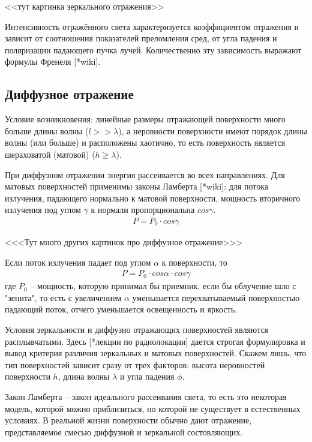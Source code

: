 <<тут картинка зеркального отражения>>

Интенсивность отражённого света характеризуется коэффициентом отражения и зависит от соотношения показателей преломления сред, от угла падения и поляризации падающего пучка лучей. Количественно эту зависимость выражают формулы Френеля [*wiki].

\subsection*{Диффузное отражение}

Условие возникновения: линейные размеры отражающей поверхности много больше длины волны ($ l >> \lambda $), а неровности поверхности имеют порядок длины волны (или больше) и расположены хаотично, то есть поверхность является шераховатой (матовой) ($ h \ge \lambda $). 

При диффузном отражении энергия рассеивается во всех направлениях. Для матовых поверхностей применимы законы Ламберта [*wiki]: для потока излучения, падающего нормально к матовой поверхности, мощность вторичного излучения под углом $ \gamma $ к нормали пропорциональна $ cos \gamma $. 
\begin{gather}
 P = P_0 \cdot cos \gamma
\end {gather}

<<<Тут много других картинок про диффузное отражение>>>

Если поток излучения падает под углом $\alpha$ к поверхности, то 
\begin{gather}
 P = P_0 \cdot cos \alpha \cdot cos \gamma
\end {gather}
где $ P_0 $ -- мощность, которую принимал бы приемник, если бы облучение шло с "зенита", то есть с увеличением $\alpha$ уменьшается перехватываемый поверхностью падающий поток, отчего уменьшается освещенность и яркость. 

Условия зеркальности и диффузно отражающих поверхностей являются расплывчатыми. Здесь [*лекции по радиолокации] дается строгая формулировка и вывод критерия различия зеркальных и матовых поверхностей. Скажем лишь, что тип поверхностей зависит сразу от трех факторов: высота неровностей поверхности $h$, длина волны $\lambda$ и угла падения $\phi$.

Закон Ламберта -- закон идеального рассеивания света, то есть это некоторая модель, которой можно приблизиться, но которой не существует в естественных условиях. В реальной жизни поверхности обычно дают отражение, представляемое смесью диффузной и зеркальной состовляющих. 

